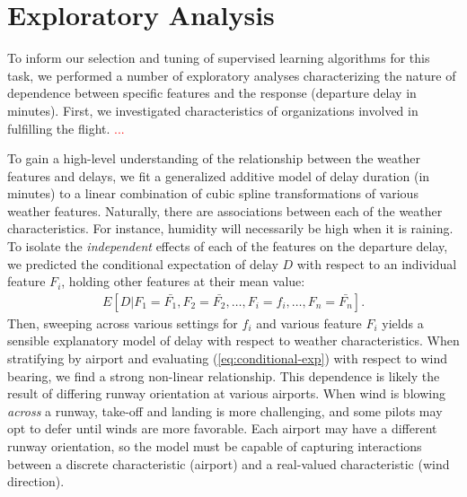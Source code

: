 \documentclass{article}
\begin{document}
\section{Exploratory Analysis}
\label{sec:exploratory}

To inform our selection and tuning of supervised learning algorithms for this task, we performed a number of exploratory analyses characterizing the nature of dependence between specific features and the response (departure delay in minutes). First, we investigated characteristics of organizations involved in fulfilling the flight. \textcolor{red}{...}

To gain a high-level understanding of the relationship between the weather features and delays, we fit a generalized additive model \citep{hastie1990generalized} of delay duration (in minutes) to a linear combination of cubic spline transformations of various weather features. Naturally, there are associations between each of the weather characteristics. For instance, humidity will necessarily be high when it is raining. To isolate the \emph{independent} effects of each of the features on the departure delay, we predicted the conditional expectation of delay $D$ with respect to an individual feature $F_i$, holding other features at their mean value:
\begin{align}
    \label{eq:conditional-exp}
    E[D|F_1=\bar{F_1}, F_2=\bar{F_2}, \ldots, F_i = f_i, \ldots, F_n = \bar{F_n}].
\end{align}
Then, sweeping across various settings for $f_i$ and various feature $F_i$ yields a sensible explanatory model of delay with respect to weather characteristics. When stratifying by airport and evaluating (\ref{eq:conditional-exp}) with respect to wind bearing, we find a strong non-linear relationship. This dependence is likely the result of differing runway orientation at various airports. When wind is blowing \emph{across} a runway, take-off and landing is more challenging, and some pilots may opt to defer until winds are more favorable. Each airport may have a different runway orientation, so the model must be capable of capturing interactions between a discrete characteristic (airport) and a real-valued characteristic (wind direction).
\end{document}
